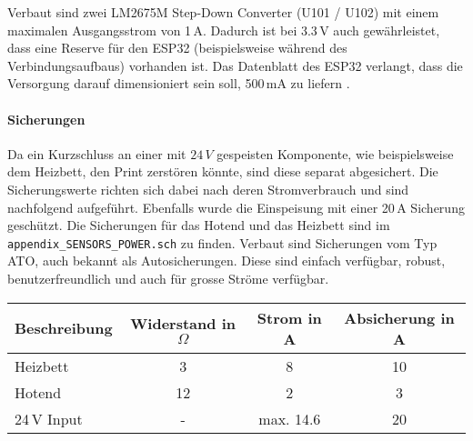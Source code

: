 Verbaut sind zwei LM2675M Step-Down Converter (U101 / U102) mit einem maximalen Ausgangsstrom von 1\,A. Dadurch ist bei 3.3\,V auch gewährleistet, dass eine Reserve für den ESP32 (beispielsweise während des Verbindungsaufbaus) vorhanden ist. Das Datenblatt des ESP32 verlangt, dass die Versorgung darauf dimensioniert sein soll, 500\,mA zu liefern \cite[S. 10]{ESP32}.\\


\paragraph{Sicherungen}
Da ein Kurzschluss an einer mit $24\,\si{V}$ gespeisten Komponente, wie beispielsweise dem Heizbett, den Print zerstören könnte, sind diese separat abgesichert. Die Sicherungswerte richten sich dabei nach deren Stromverbrauch und sind nachfolgend aufgeführt. Ebenfalls wurde die Einspeisung mit einer 20\,A Sicherung geschützt. Die Sicherungen für das Hotend und das Heizbett sind im \texttt{appendix\_SENSORS\_POWER.sch} zu finden. Verbaut sind Sicherungen vom Typ ATO, auch bekannt als Autosicherungen. Diese sind einfach verfügbar, robust, benutzerfreundlich und auch für grosse Ströme verfügbar. 

\begin{table}[H]
\centering
\def\arraystretch{1.1} 
\begin{tabular}{|l|c|c|c|}
\hline
\textbf{Beschreibung} & \textbf{Widerstand in $\Omega$} & \textbf{Strom in A} & \textbf{Absicherung in A}  \\ \hline
Heizbett     & 3                    & 8             & 10              \\ \hline     
Hotend         & 12                   & 2             & 3               \\ \hline
24\,V Input      & -                    & max. 14.6              & 20              \\ \hline 
\end{tabular}
\end{table}

\vspace{3mm}
